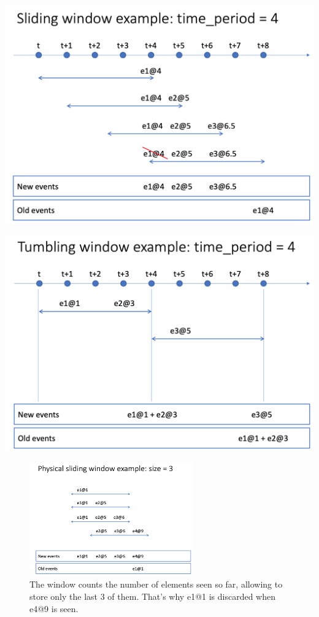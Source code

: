 \documentclass[10pt,a4paper]{article}
\begin{document}
\begin{minipage}{.5\textwidth}
  \centering
  \includegraphics[width=.8\linewidth]{images/epl-window-1}
\end{minipage}%
\begin{minipage}{.5\textwidth}
  \centering
  \includegraphics[width=.8\linewidth]{images/epl-window-2}
\end{minipage}

\begin{figure}[ht!]
 \hfill \includegraphics[width=200pt]{images/epl-window-3.png}\hspace*{\fill}
 \caption{The window counts the number of elements seen so far, allowing to store only the last 3 of them. That's why e1@1 is discarded when e4@9 is seen.}
\end{figure} 
\end{document}
